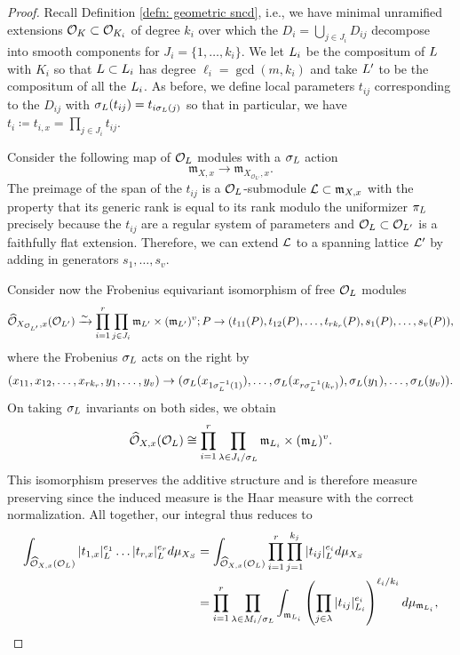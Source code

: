 \documentclass[10pt]{article}
\theoremstyle{plain}
\theoremstyle{definition}
\numberwithin{equation}{section}
\begin{document}
\begin{proof}
Recall Definition \ref{defn: geometric sncd}, i.e., we have minimal unramified extensions ${{\mathcal O}_{K}}\subset \mathcal O_{K_i}$ of degree $k_i$ over which the $D_i = \bigcup_{j\in J_i}D_{ij}$ decompose into smooth components for $J_i = \{1,\dots,k_i\}$. We let ${L}_i$ be the compositum of ${L}$ with ${K_i}$ so that ${L} \subset {L}_i$ has degree $\ell_i = \gcd(m,k_i)$ and take  ${L}'$ to be the compositum of all the ${L}_i$. As before, we define local parameters $t_{ij}$ corresponding to the $D_{ij}$ with $\sigma_{L}(t_{ij}) = t_{i\sigma_{L}(j)}$ so that in particular, we have $t_i \coloneqq t_{i,x} = \prod_{j \in J_i}t_{ij}$. 

Consider the following map of ${{\mathcal O}_{L}}$ modules with a $\sigma_{L}$ action \[\mathfrak m_{X,x} \to \mathfrak m_{X_{\mathcal O_{L'}},x}.\]
The preimage of the span of the $t_{ij}$  is a ${{\mathcal O}_{L}}$-submodule ${\mathcal L} \subset \mathfrak m_{X,x}$ with the property that its generic rank is equal to its rank modulo the uniformizer $\pi_{L}$ precisely because the $t_{ij}$ are a regular system of parameters and ${{\mathcal O}_{L}} \subset \mathcal O_{L'}$ is a faithfully flat extension. Therefore, we can extend ${\mathcal L}$ to a spanning lattice ${\mathcal L}'$ by adding in generators $s_1,\dots,s_v$.

Consider now the Frobenius equivariant isomorphism of free ${{\mathcal O}_{L}}$ modules 
\begin{equation}\label{eqn: co-ord isomorphism}
    \widehat{{\mathcal O}}_{X_{\mathcal O_{L'}},x}(\mathcal O_{L'}) \xrightarrow{\sim} \prod_{i=1}^{r}\prod_{j \in J_i}\mathfrak m_{{L}'}\times (\mathfrak m_{{L}'})^v; P \to (t_{11}(P),t_{12}(P),\dots,t_{rk_r}(P),s_1(P),\dots,s_v(P)),
\end{equation} 
where the Frobenius $\sigma_{L}$ acts on the right by
\[(x_{11}, x_{12},\dots, x_{rk_r}, y_1, \dots, y_v) \to (\sigma_{L}(x_{1\sigma_{L}^{-1}(1)}),\dots, \sigma_{L}(x_{r\sigma_{L}^{-1}(k_r)}), \sigma_{L}(y_1), \dots, \sigma_{L}(y_v)).\]
On taking $\sigma_{L}$ invariants on both sides, we obtain
\[ \widehat{{\mathcal O}}_{X,x}({{\mathcal O}_{L}}) \cong \prod_{i=1}^r\prod_{\lambda \in J_i/\sigma_{L}}\mathfrak m_{{L}_i}\times (\mathfrak m_{{L}})^v.\]
This isomorphism preserves the additive structure and is therefore measure preserving since the induced measure is the Haar measure with the correct normalization. All together, our integral thus reduces to
\begin{align*}
    \int_{\widehat{{\mathcal O}}_{X,x}({{\mathcal O}_{L}})}|t_{1,x}|_{{L}}^{e_1}\dots |t_{r,x}|_{{L}}^{e_r}d\mu_{X_{S}} &= \int_{{\widehat{{\mathcal O}}}_{X,x}({{\mathcal O}_{L}})}\prod_{i=1}^r\prod_{j=1}^{k_j}|t_{ij}|_{{L}}^{e_i}d\mu_{X_{S}}\\
    &= \prod_{i=1}^r\prod_{\lambda \in M_i/\sigma_{L}}\int_{\mathfrak m_{{L}_i}}\left(\prod_{j \in \lambda}|t_{ij}|_{{L}_i}^{e_i}\right)^{\ell_i/k_i}d\mu_{\mathfrak m_{{L}_i}},
\end{align*}


\end{proof}
\end{document}
